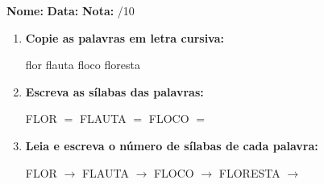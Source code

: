 \begin{exercicio}



\noindent\textbf{Nome:} \underline{\hspace{3.2cm}} \quad \textbf{Data:} \underline{\hspace{1.6cm}} \quad \textbf{Nota:} \underline{\hspace{0.9cm}}/10


\begin{enumerate}

  \item \textbf{Copie as palavras em letra cursiva:}
  \begin{center}
  flor \quad flauta \quad floco \quad floresta
  \end{center}
  \begin{center}
  \underline{\hspace{2.4cm}} \quad \underline{\hspace{2.4cm}} \quad \underline{\hspace{2.4cm}} \quad \underline{\hspace{2.4cm}}
  \end{center}

  \item \textbf{Escreva as sílabas das palavras:}
  \begin{center}
  FLOR $=$ \underline{\hspace{1.5cm}} \underline{\hspace{1.5cm}} \quad FLAUTA $=$ \underline{\hspace{1.5cm}} \underline{\hspace{1.5cm}} \quad FLOCO $=$ \underline{\hspace{1.5cm}} \underline{\hspace{1.5cm}}
  \end{center}

  \item \textbf{Leia e escreva o número de sílabas de cada palavra:}
  \begin{center}
  FLOR $\rightarrow$ \underline{\hspace{0.9cm}} \quad FLAUTA $\rightarrow$ \underline{\hspace{0.9cm}} \quad FLOCO $\rightarrow$ \underline{\hspace{0.9cm}} \quad FLORESTA $\rightarrow$ \underline{\hspace{0.9cm}}
  \end{center}


\end{enumerate}
\end{exercicio}
